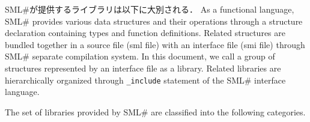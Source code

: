 \documentclass{jbook}
\newcommand{\smlsharp}{SML\#}
\newcommand{\code}[1]{\mbox{\large\tt #1}}
\begin{document}
	\smlsharp{}が提供するライブラリは以下に大別される．
\else%
	As a functional language, \smlsharp{} provides various data
structures and their operations through a structure declaration
containing types and function definitions.
	Related structures are bundled together in a source file (sml
file) with an interface file (smi file) through \smlsharp{} separate
compilation system.
	In this document, we call a group of structures represented by
an interface file as a library.
	Related libraries are hierarchically organized through \code{\_include}
statement of the \smlsharp{} interface language.
	
	The set of libraries provided by \smlsharp{} are classified into the
following categories.
\fi%
\end{document}
